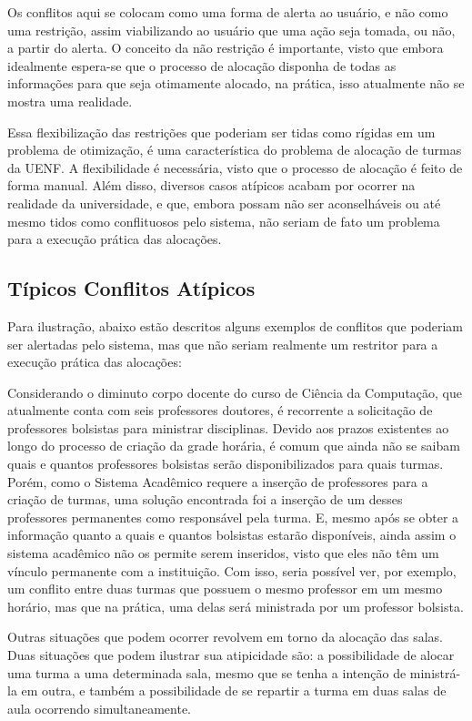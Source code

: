 Os conflitos aqui se colocam como uma forma de alerta ao usuário, e não como uma restrição, assim viabilizando ao usuário que uma ação seja tomada, ou não, a partir do alerta. O conceito da não restrição é importante, visto que embora idealmente espera-se que o processo de alocação disponha de todas as informações para que seja otimamente alocado, na prática, isso atualmente não se mostra uma realidade.

Essa flexibilização das restrições que poderiam ser tidas como rígidas em um problema de otimização, é uma característica do problema de alocação de turmas da UENF. A flexibilidade é necessária, visto que o processo de alocação é feito de forma manual. Além disso, diversos casos atípicos acabam por ocorrer na realidade da universidade, e que, embora possam não ser aconselháveis ou até mesmo tidos como conflituosos pelo sistema, não seriam de fato um problema para a execução prática das alocações.

\subsection{Típicos Conflitos Atípicos}

Para ilustração, abaixo estão descritos alguns exemplos de conflitos que poderiam ser alertadas pelo sistema, mas que não seriam realmente um restritor para a execução prática das alocações:

Considerando o diminuto corpo docente do curso de Ciência da Computação, que atualmente conta com seis professores doutores, é recorrente a solicitação de professores bolsistas para ministrar disciplinas. Devido aos prazos existentes ao longo do processo de criação da grade horária, é comum que ainda não se saibam quais e quantos professores bolsistas serão disponibilizados para quais turmas. Porém, como o Sistema Acadêmico requere a inserção de professores para a criação de turmas, uma solução encontrada foi a inserção de um desses professores permanentes como responsável pela turma. E, mesmo após se obter a informação quanto a quais e quantos bolsistas estarão disponíveis, ainda assim o sistema acadêmico não os permite serem inseridos, visto que eles não têm um vínculo permanente com a instituição. Com isso, seria possível ver, por exemplo, um conflito entre duas turmas que possuem o mesmo professor em um mesmo horário, mas que na prática, uma delas será ministrada por um professor bolsista.

Outras situações que podem ocorrer revolvem em torno da alocação das salas. Duas situações que podem ilustrar sua atipicidade são: a possibilidade de alocar uma turma a uma determinada sala, mesmo que se tenha a intenção de ministrá-la em outra, e também a possibilidade de se repartir a turma em duas salas de aula ocorrendo simultaneamente.

